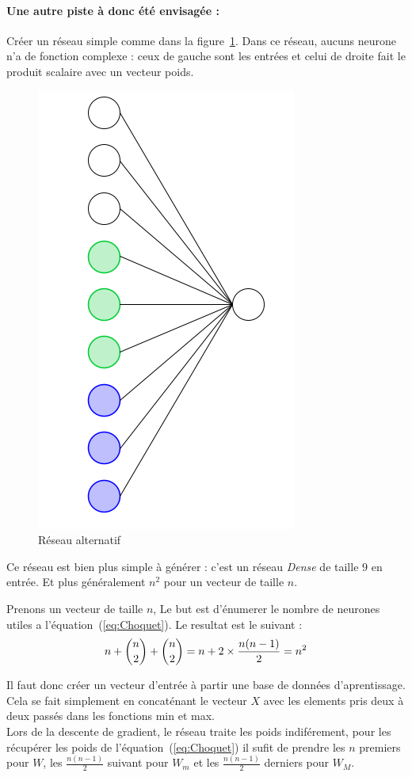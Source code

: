 \paragraph{Une autre piste à donc été envisagée :}
Créer un réseau simple comme dans la figure\ \ref{fig:net3}.
Dans ce réseau, aucuns neurone n'a de fonction complexe :
ceux de gauche sont les entrées et
celui de droite fait le produit scalaire avec un vecteur poids.
\begin{figure}[H]
    \center
    \includegraphics[height=\petit]{pict/net3.png}
	\caption{Réseau alternatif}
	\label{fig:net3}
\end{figure}
\vspace{-12pt}
Ce réseau est bien plus simple à générer : c'est un réseau \emph{Dense} de taille $9$ en entrée.
Et plus généralement $n^2$ pour un vecteur de taille $n$.


{
Prenons un vecteur de taille $n$,
Le but est d'énumerer le nombre de neurones utiles a l'équation\ (\ref{eq:Choquet}).
Le resultat est le suivant :
\begin{equation}
    n + \dbinom{n}{2} + \dbinom{n}{2} = n + 2 \times \frac{n(n-1)}{2} = n^2
\end{equation}
}

Il faut donc créer un vecteur d'entrée à partir une base de données d'aprentissage.
Cela se fait simplement en concaténant le vecteur $X$ avec les elements pris deux à deux passés
dans les fonctions min et max.\\


Lors de la descente de gradient, le réseau traite les poids indiférement,
pour les récupérer les poids de l'équation\ (\ref{eq:Choquet})
il sufit de prendre les $n$ premiers pour $W$,
les $\frac{n(n-1)}{2}$ suivant pour $W_m$
et les $\frac{n(n-1)}{2}$ derniers pour $W_M$.
